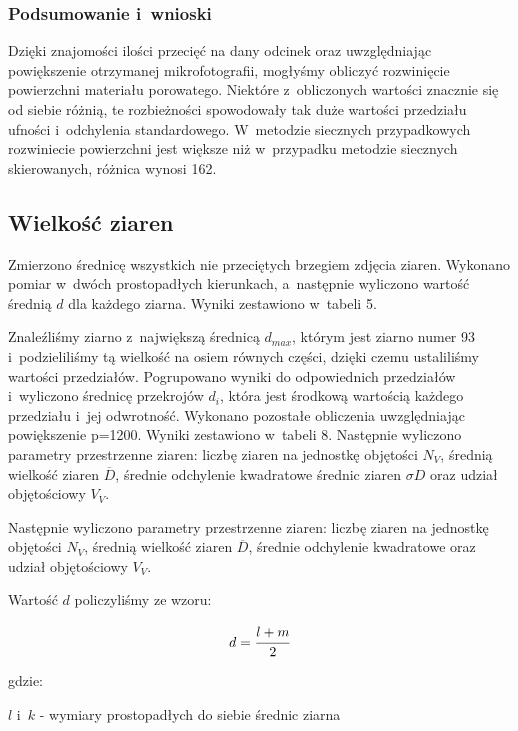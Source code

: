 \documentclass[a4paper,12pt]{article}
\begin{document}
\newpage
{\color{purple}
\subsubsection{Podsumowanie i~wnioski}



Dzięki znajomości ilości przecięć na dany odcinek oraz uwzględniając powiększenie otrzymanej mikrofotografii, mogłyśmy obliczyć rozwinięcie powierzchni materiału porowatego. Niektóre z~obliczonych wartości znacznie się od siebie różnią, te rozbieżności spowodowały tak duże wartości przedziału ufności i~odchylenia standardowego.{\color{blue} W~metodzie siecznych przypadkowych rozwiniecie powierzchni jest większe niż w~przypadku metodzie siecznych skierowanych, różnica wynosi 162.}}
\newpage

\subsection{Wielkość ziaren}

Zmierzono średnicę wszystkich nie przeciętych brzegiem zdjęcia ziaren. Wykonano pomiar w~dwóch prostopadłych kierunkach, a~następnie wyliczono wartość średnią $d$ dla każdego ziarna. Wyniki zestawiono w~tabeli 5.

Znaleźliśmy ziarno z~największą średnicą $d_{max}$, którym jest ziarno numer 93 i~podzieliliśmy tą wielkość na osiem równych części, dzięki czemu ustaliliśmy wartości przedziałów. Pogrupowano wyniki do odpowiednich przedziałów i~wyliczono średnicę przekrojów $d_i$, która jest środkową wartością każdego przedziału i~jej odwrotność. Wykonano pozostałe obliczenia uwzględniając powiększenie p=1200. Wyniki zestawiono w~tabeli 8.
Następnie wyliczono parametry przestrzenne ziaren: liczbę ziaren na jednostkę objętości $N_V$, średnią wielkość ziaren $\overline{D}$, średnie odchylenie kwadratowe średnic ziaren $\sigma D$ oraz udział objętościowy $V_V$.

Następnie wyliczono parametry przestrzenne ziaren: liczbę ziaren na jednostkę objętości $N_V$, średnią wielkość ziaren $\overline{D}$, średnie odchylenie kwadratowe oraz udział objętościowy $V_V$.

Wartość $d$ policzyliśmy ze wzoru:

$$d=\cfrac{l+m}{2}$$

gdzie:

$l$ i~$k$ - wymiary prostopadłych do siebie średnic ziarna
\end{document}
